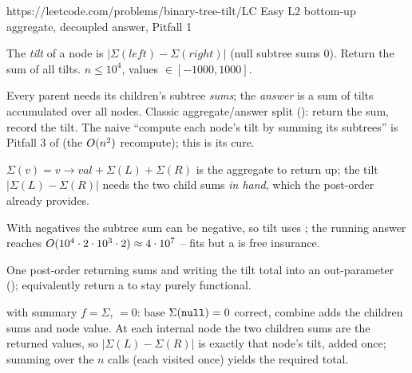   {https://leetcode.com/problems/binary-tree-tilt/}{LC Easy L2}
  {bottom-up aggregate, decoupled answer, Pitfall 1}

\begin{problemstatement}
The \emph{tilt} of a node is $|\Sigma(\mathit{left}) - \Sigma(\mathit{right})|$
(null subtree sums $0$). Return the sum of all tilts. $n \le 10^4$,
values $\in[-1000,1000]$.
\end{problemstatement}

Every parent needs its children's subtree \emph{sums}; the \emph{answer} is a sum
of tilts accumulated over all nodes. Classic aggregate/answer split
(): return the sum, record the tilt. The naive ``compute
each node's tilt by summing its subtrees'' is Pitfall 3 of 
(the $O(n^2)$ recompute); this is its cure.

\begin{observation}
$\Sigma(v) = v\to\mathit{val} + \Sigma(L) + \Sigma(R)$ is the aggregate to
return up; the tilt $|\Sigma(L)-\Sigma(R)|$ needs the two child sums \emph{in
hand}, which the post-order already provides.
\end{observation}
\begin{observation}
With negatives the subtree sum can be negative, so tilt uses
; the running answer reaches $O(10^{4}\cdot 2\cdot10^{3}\cdot 2)
\approx 4\cdot10^{7}$ -- fits  but a  is free insurance.
\end{observation}

One post-order returning  sums and writing the tilt total into an
out-parameter (); equivalently return a 
to stay purely functional.

\begin{proofbox}
 with summary $f=\Sigma$, $=0$: base
$\Sigma(\texttt{null})=0$ correct, combine adds the children sums and node value. At each
internal node the two children sums are the returned values, so
$|\Sigma(L)-\Sigma(R)|$ is exactly that node's tilt, added once; summing over
the $n$ calls (each visited once) yields the required total.
\end{proofbox}


